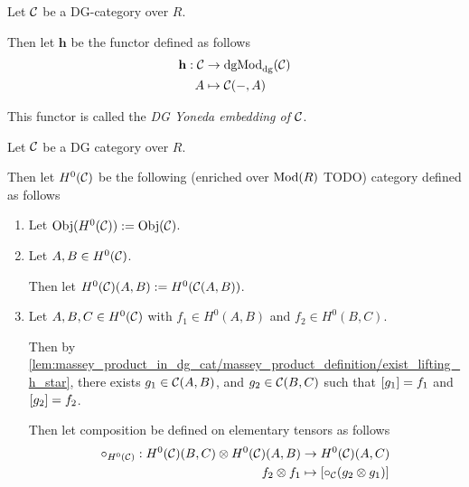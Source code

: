 \begin{definition}
    \label{def:DG_Yoneda_embedding}
    Let \( {\mathcal{C}} \) be a DG-category over \( R \).
    
    Then let \( \mathbf{h} \) be the functor defined as follows
    \begin{align*}
        \mathbf{h}: {\mathcal{C}} &\to \operatorname{dgMod}_{\operatorname{dg}}({\mathcal{C}}) \\
        A &\mapsto {\mathcal{C}}(-, A)
    \end{align*}

    This functor is called the \emph{DG Yoneda embedding of \( {\mathcal{C}} \)}.
\end{definition}


\begin{definition}
    Let \( {\mathcal{C}} \) be a DG category over \( R \).

    Then let \( H^0({\mathcal{C}}) \) be the following (enriched over \( \operatorname{Mod}(R) \) TODO) category defined as follows
    \begin{enumerate}
        \item {
            Let \( \operatorname{Obj}(H^0({\mathcal{C}})) := \operatorname{Obj}({\mathcal{C}}) \).
        }
        \item {
            Let \( A, B \in H^0({\mathcal{C}}) \).

            Then let \( H^0({\mathcal{C}})(A, B) := H^0({\mathcal{C}}(A, B)) \).
        }
        \item {
            Let \( A, B, C \in H^0({\mathcal{C}}) \) with \( f_1 \in H^0(A, B) \) and \( f_2 \in H^0(B, C) \).

            Then by \autoref{lem:massey_product_in_dg_cat/massey_product_definition/exist_lifting_h_star}, there exists \( g_1 \in {\mathcal{C}}(A, B) \), and \( g_2 \in {\mathcal{C}}(B, C) \) such that \( [g_1] = f_1 \) and \( [g_2] = f_2 \).

            Then let composition be defined on elementary tensors as follows
            \begin{align*}
                \circ_{H^0({\mathcal{C}})}: H^0({\mathcal{C}})(B, C) \otimes H^0({\mathcal{C}})(A, B) &\to H^0({\mathcal{C}})(A, C) \\
                f_2 \otimes f_1 &\mapsto [ \circ_{{\mathcal{C}}}(g_2 \otimes g_1) ]
            \end{align*}
        }
    \end{enumerate}
\end{definition}

